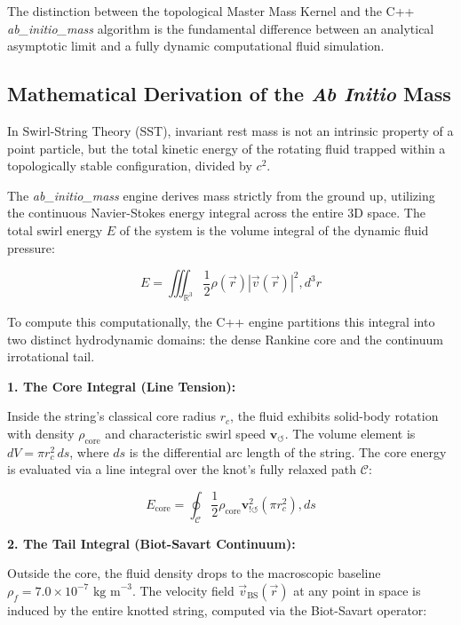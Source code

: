 \documentclass[11pt]{article}
\begin{document}
    
The distinction between the topological Master Mass Kernel and the C++ \textit{ab_initio_mass} algorithm is the fundamental difference between an analytical asymptotic limit and a fully dynamic computational fluid simulation.

\subsection*{Mathematical Derivation of the \textit{Ab Initio} Mass}

In Swirl-String Theory (SST), invariant rest mass is not an intrinsic property of a point particle, but the total kinetic energy of the rotating fluid trapped within a topologically stable configuration, divided by $c^2$.

The \textit{ab_initio_mass} engine derives mass strictly from the ground up, utilizing the continuous Navier-Stokes energy integral across the entire 3D space. The total swirl energy $E$ of the system is the volume integral of the dynamic fluid pressure:

\begin{equation}
E = \iiint_{\mathbb{R}^3} \frac{1}{2} \rho(\vec{r}) |\vec{v}(\vec{r})|^2 , d^3r
\end{equation}

To compute this computationally, the C++ engine partitions this integral into two distinct hydrodynamic domains: the dense Rankine core and the continuum irrotational tail.

\textbf{1. The Core Integral (Line Tension):}

Inside the string's classical core radius $r_c$, the fluid exhibits solid-body rotation with density $\rho_{\text{core}}$ and characteristic swirl speed $\mathbf{v}_{\!\boldsymbol{\circlearrowleft}}$. The volume element is $dV = \pi r_c^2 \, ds$, where $ds$ is the differential arc length of the string. The core energy is evaluated via a line integral over the knot's fully relaxed path $\mathcal{C}$:

\begin{equation}
E_{\text{core}} = \oint_{\mathcal{C}} \frac{1}{2} \rho_{\text{core}} \mathbf{v}_{!\boldsymbol{\circlearrowleft}}^2 \left(\pi r_c^2\right) , ds
\end{equation}

\textbf{2. The Tail Integral (Biot-Savart Continuum):}

Outside the core, the fluid density drops to the macroscopic baseline $\rho_{\!f} = 7.0 \times 10^{-7} \text{ kg m}^{-3}$. The velocity field $\vec{v}_{\text{BS}}(\vec{r})$ at any point in space is induced by the entire knotted string, computed via the Biot-Savart operator:
\end{document}
